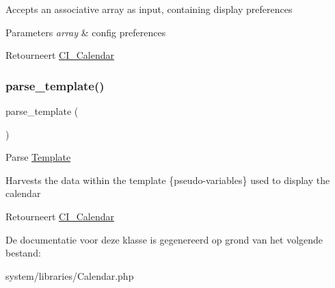 Accepts an associative array as input, containing display preferences


\begin{DoxyParams}{Parameters}
{\em array} & config preferences \\
\hline
\end{DoxyParams}
\begin{DoxyReturn}{Retourneert}
\mbox{\hyperlink{class_c_i___calendar}{C\+I\+\_\+\+Calendar}} 
\end{DoxyReturn}
\mbox{\label{class_c_i___calendar_ac0331959620d18320ab6587621730d44}} 
\subsubsection{\texorpdfstring{parse\_template()}{parse\_template()}}
{\footnotesize\ttfamily parse\+\_\+template (\begin{DoxyParamCaption}{ }\end{DoxyParamCaption})}

Parse \mbox{\hyperlink{class_template}{Template}}

Harvests the data within the template \{pseudo-\/variables\} used to display the calendar

\begin{DoxyReturn}{Retourneert}
\mbox{\hyperlink{class_c_i___calendar}{C\+I\+\_\+\+Calendar}} 
\end{DoxyReturn}


De documentatie voor deze klasse is gegenereerd op grond van het volgende bestand\+:\begin{DoxyCompactItemize}
\item 
system/libraries/Calendar.\+php\end{DoxyCompactItemize}

